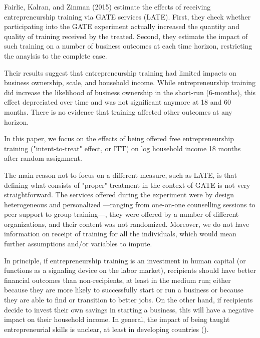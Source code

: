 Fairlie, Kalran, and Zinman (2015) estimate the effects of receiving entrepreneurship training via GATE services (LATE). First, they check whether participating into the GATE experiment actually increased the quantity and quality of training received by the treated. Second, they estimate the impact of such training on a number of business outcomes at each time horizon, restricting the anaylsis to the complete case.

Their results suggest that entrepreneurship training had limited impacts on business ownership, scale, and household income. While entrepreneurship training did increase the likelihood of business ownership in the short-run (6-months), this effect depreciated over time and was not significant anymore at 18 and 60 months. There is no evidence that training affected other outcomes at any horizon.

In this paper, we focus on the effects of being offered free entrepreneurship training ("intent-to-treat" effect, or ITT) on log household income 18 months after random assignment.

The main reason not to focus on a different measure, such as LATE, is that defining what consists of "proper" treatment in the context of GATE is not very straightforward. The services offered during the experiment were by design heterogeneous and personalized ---ranging from one-on-one counselling sessions to peer support to group training---, they were offered by a number of different organizations, and their content was not randomized. Moreover, we do not have information on receipt of training for all the individuals, which would mean further assumptions and/or variables to impute.

In principle, if entrepreneurship training is an investment in human capital (or functions as a signaling device on the labor market), recipients should have better financial outcomes than non-recipients, at least in the medium run; either because they are more likely to successfully start or run a business or because they are able to find or transition to better jobs. On the other hand, if recipients decide to invest their own savings in starting a business, this will have a negative impact on their household income. In general, the impact of being taught entrepreneurial skills is unclear, at least in developing countries (\cite{mckenzie2014}).
